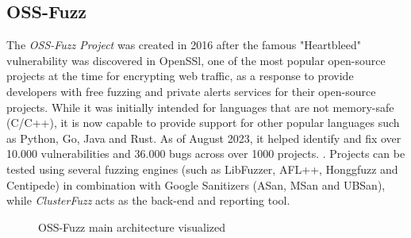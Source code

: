 \documentclass[Lau,oneside]{sapthesis}%
\begin{document}
\subsection{OSS-Fuzz}
The \textit{OSS-Fuzz Project} was created in 2016 after the famous "Heartbleed" vulnerability was discovered in OpenSSl, one of the most popular open-source projects at the time for encrypting web traffic, as a response to provide developers with free fuzzing and private alerts services for their open-source projects.
While it was initially intended for languages that are not memory-safe (C/C++), it is now capable to provide support for other popular languages such as Python, Go, Java and Rust.  
\newline
As of August 2023, it helped identify and fix over 10.000 vulnerabilities and 36.000 bugs across over 1000 projects. \cite{ref:ossfuzz_docs}.
\newline \newline
Projects can be tested using several fuzzing engines (such as LibFuzzer, AFL++, Honggfuzz and Centipede) in combination with Google Sanitizers (ASan, MSan and UBSan), while \textit{ClusterFuzz} acts as the back-end and reporting tool.
\newline \newline
\begin{figure}[h]
\caption{OSS-Fuzz main architecture visualized \cite{ref:ossfuzz_docs}}
\label{fig:ossfuzz_architecture}
\end{figure}
\end{document}
